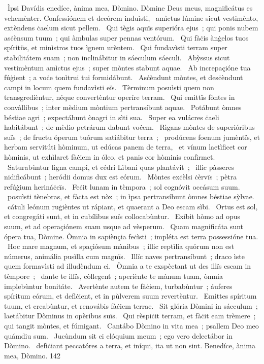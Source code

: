 {~Ìpsi Davídis}
{%
enedíce, ànima mea, Dòmino. Dòmine Deus meus, magnificátus es vehemènter. Confessiónem et decórem induìsti,
~amìctus lúmine sicut vestimènto, extèndens ċaelum sicut pellem.
~Qui tègis aquïs superióra ejus~; qui ponis nubem asċènsum tuum~; qui àmbulas super pennas ventórum.
~Qui fàċis ànġelos tuos spíritüs, et minìstros tuos ìgnem urèntem.
~Qui fundavìsti terram super stabilitátem suam~; non inclinábitur in sáeculum sáeculi.
~Abỳssus sicut vestimèntum amìctus ejus~; super mòntes stabunt aquae.
~Ab increpaçióne tua fúġient~; a voċe tonìtrui tui formidábunt.
~Asċèndunt mòntes, et desċèndunt campi in locum quem fundavìsti eïs.
~Tèrminum posuìsti quem non transgredièntur, néque convertèntur operíre terram.
~Qui emìttïs fòntes in convàllibus~; inter mèdium mòntium pertransíbunt aquae.
~Potábunt òmnes béstiae agri~; expectábunt ònagri in sìti sua.
~Super ea vulácres ċaeli habitábunt~; de mèdio petrárum dabunt voċem.
~Rìgans mòntes de superióribus suïs~; de fructu óperum tuórum satiábitur terra~;
~prodúcens foenum jumèntïs, et herbam servitúti hòminum, ut edúcas panem de terra,
~et vínum laetìficet cor hòminis, ut exhìlaret fàċiem in óleo, et panis cor hòminis confìrmet.
~Saturabùntur lìgna campi, et cédri Lìbani quas plantávit~;
~illic pàsseres nidificábunt~; heródii domus dux est eórum.
~Mòntes exċèlsi ċèrvïs~; pètra refúġium herináċeïs.
~Feċit lunam in tèmpora~; sol cognóvit occásum suum.
~posuìsti tènebras, et fàcta est nòx~; in ìpsa pertransíbunt òmnes béstiae sỳlvae.
~cátuli leónum ruġièntes ut rápiant, et quaerant a Deo escam sìbi.
~Ortus est sol, et congregáti sunt, et in cubílibus suïs collocabùntur.
~Exíbit hòmo ad opus suum, et ad operaçiónem suam usque ad vèsperum.
~Quam magnificáta sunt ópera tua, Dòmine. Òmnia in sapiènçia feċìsti~; impléta est terra possessióne tua.
~Hoc mare magnum, et spaçiósum mànibus~; illic reptìlia quórum non est númerus, animália pusìlla cum magnïs.
~Illïc naves pertransíbunt~; draco ìste quem formavìsti ad illudèndum ei.
~Òmnia a te exspèctant ut des illïs escam in tèmpore~;
~dante te illïs, còllegent~; aperiènte te mànum tuam, òmnia implebùntur bonitáte.
~Avertènte autem te fàċiem, turbabùntur~; áuferes spíritum eórum, et defìċient, et in pùlverem suum revertèntur.
~Emìttes spíritum tuum, et creabùntur, et renovábis fàċiem terrae.
~Sit glória Dòmini in sáeculum~; laetábitur Dòminus in opèribus suïs.
~Qui rèspiċit terram, et fàċit eam trèmere~; qui tangit mòntes, et fúmigant.
~Cantábo Dòmino in vita mea~; psallem Deo meo quámdiu sum.
~Jucùndum sit ei elóquium meum~; ego vero delectábor in Dòmino.
~defìċiant peccatóres a terra, et iníqui, ita ut non sint. Benedíce, ànima mea, Dòmino.
}
{14}{2}
